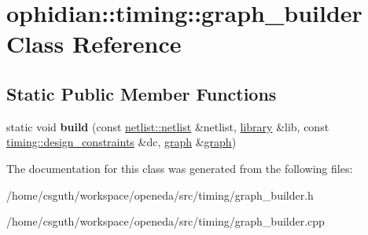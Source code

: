 \hypertarget{classophidian_1_1timing_1_1graph__builder}{\section{ophidian\-:\-:timing\-:\-:graph\-\_\-builder Class Reference}
\label{classophidian_1_1timing_1_1graph__builder}
}
\subsection*{Static Public Member Functions}
\begin{DoxyCompactItemize}
\item 
\hypertarget{classophidian_1_1timing_1_1graph__builder_a3e2366f8b89d08c41ebfbfa3d1456266}{static void {\bfseries build} (const \hyperlink{classophidian_1_1netlist_1_1netlist}{netlist\-::netlist} \&netlist, \hyperlink{classophidian_1_1timing_1_1library}{library} \&lib, const \hyperlink{structophidian_1_1timing_1_1design__constraints}{timing\-::design\-\_\-constraints} \&dc, \hyperlink{classophidian_1_1timing_1_1graph}{graph} \&\hyperlink{classophidian_1_1timing_1_1graph}{graph})}\label{classophidian_1_1timing_1_1graph__builder_a3e2366f8b89d08c41ebfbfa3d1456266}

\end{DoxyCompactItemize}


The documentation for this class was generated from the following files\-:\begin{DoxyCompactItemize}
\item 
/home/csguth/workspace/openeda/src/timing/graph\-\_\-builder.\-h\item 
/home/csguth/workspace/openeda/src/timing/graph\-\_\-builder.\-cpp\end{DoxyCompactItemize}
